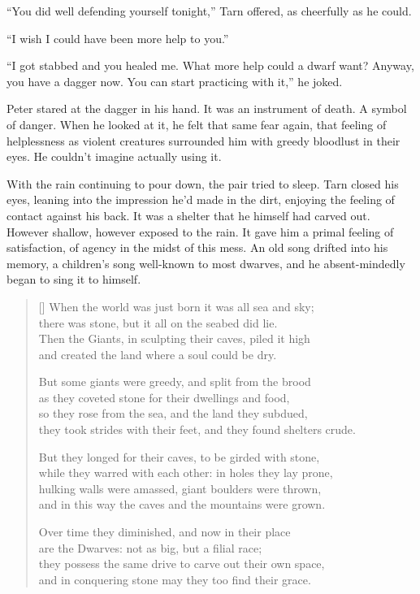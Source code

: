 ``You did well defending yourself tonight,'' Tarn offered, as cheerfully as he could.

``I wish I could have been more help to you.''

``I got stabbed and you healed me.  What more help could a dwarf want?  Anyway, you have a dagger now.  You can start practicing with it,'' he joked.

Peter stared at the dagger in his hand.  It was an instrument of death.  A symbol of danger.  When he looked at it, he felt that same fear again, that feeling of helplessness as violent creatures surrounded him with greedy bloodlust in their eyes.  He couldn't imagine actually using it.

With the rain continuing to pour down, the pair tried to sleep.  Tarn closed his eyes, leaning into the impression he'd made in the dirt, enjoying the feeling of contact against his back.  It was a shelter that he himself had carved out.  However shallow, however exposed to the rain.  It gave him a primal feeling of satisfaction, of agency in the midst of this mess.  An old song drifted into his memory, a children's song well-known to most dwarves, and he absent-mindedly began to sing it to himself.

\settowidth{\versewidth}{When the world was just born it was all sea and sky;}
\begin{verse}[\versewidth]
When the world was just born it was all sea and sky;\\
there was stone, but it all on the seabed did lie.\\
Then the Giants, in sculpting their caves, piled it high\\
and created the land where a soul could be dry.

But some giants were greedy, and split from the brood\\
as they coveted stone for their dwellings and food,\\
so they rose from the sea, and the land they subdued,\\
they took strides with their feet, and they found shelters crude.

But they longed for their caves, to be girded with stone,\\
while they warred with each other: in holes they lay prone,\\
hulking walls were amassed, giant boulders were thrown,\\
and in this way the caves and the mountains were grown.

Over time they diminished, and now in their place\\
are the Dwarves: not as big, but a filial race;\\
they possess the same drive to carve out their own space,\\
and in conquering stone may they too find their grace.
\end{verse}






